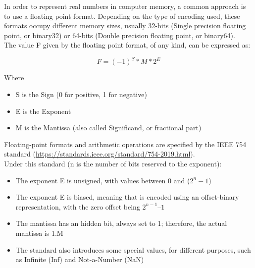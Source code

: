 In order to represent real numbers in computer memory, a common approach is to use a floating point format. Depending on the type of encoding used, these formats occupy different memory sizes, usually 32-bits (Single precision floating point, or binary32) or 64-bits (Double precision floating point, or binary64). \\
The value F given by the floating point format, of any kind, can be expressed as:

$$F = (-1)^{S}*M*2^{E} $$

Where 
\begin{itemize}
	\item S is the Sign (0 for positive, 1 for negative)
	\item E is the Exponent
	\item M is the Mantissa (also called Significand, or fractional part)
\end{itemize}

Floating-point formats and arithmetic operations are specified by the IEEE 754 standard (\url{https://standards.ieee.org/standard/754-2019.html}). \\
Under this standard (n is the number of bits reserved to the exponent):
\begin{itemize}
	\item The exponent E is unsigned, with values between 0 and ($2^{n} -1$)
	\item	The exponent E is biased, meaning that is encoded using an offset-binary representation, with the zero offset being 			$2^{n-1} – 1$
	\item	The mantissa has an hidden bit, always set to 1; therefore, the actual mantissa is 1.M
	\item	The standard also introduces some special values, for different purposes, such as Infinite (Inf) and Not-a-Number (NaN)
\end{itemize}

